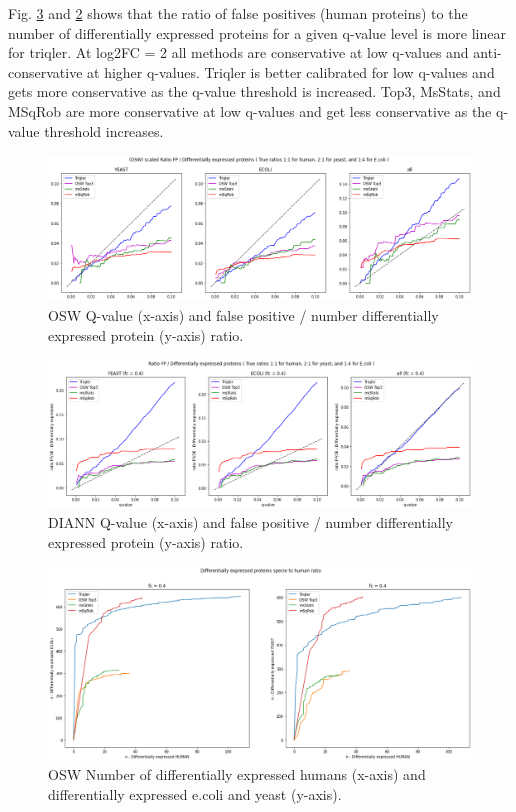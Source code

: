 \documentclass[10pt,letterpaper]{article}
\begin{document}
Fig. \ref{fig:osw_n_diff_exp} and \ref{fig:DIANN_n_diff_exp} shows that the ratio of false positives (human proteins) to the number of differentially expressed proteins for a given q-value level is more linear for triqler. At log2FC = 2 all methods are conservative at low q-values and anti-conservative at higher q-values. Triqler is better calibrated for low q-values and gets more conservative as the q-value threshold is increased. Top3, MsStats, and MSqRob are more conservative at low q-values and get less conservative as the q-value threshold increases.  

   
\begin{figure}[H]
    \centering
    \includegraphics[width=16cm]{../../result/2021-08-13_docs_plots/calibration_plot_scaled.png}
    \caption{OSW Q-value (x-axis) and false positive / number differentially expressed protein (y-axis) ratio.}
    \label{fig:osw_n_diff_exp}
\end{figure}

\begin{figure}[H]
    \centering
    \includegraphics[width=16cm]{../../result/2021-08-13_docs_plots/DIANN_calibration_plot.png}
    \caption{DIANN Q-value (x-axis) and false positive / number differentially expressed protein (y-axis) ratio.}
    \label{fig:DIANN_n_diff_exp}
\end{figure}



\begin{figure}[H]
    \centering
    \includegraphics[width=12cm]{../../result/2021-08-13_docs_plots/de_human_vs_de_specie.png}
    \caption{OSW Number of differentially expressed humans (x-axis) and differentially expressed e.coli and yeast (y-axis).}
    \label{fig:osw_n_diff_exp}
\end{figure}
\end{document}
